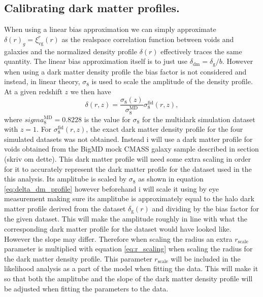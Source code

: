 \subsection{Calibrating dark matter profiles.}\label{sec:dm_calibrate}
When using a linear bias approximation we can simply approximate $\delta(r)_g=\xi_{\mathrm{vg}}^r(r)$ as the realspace correlation function between voids and galaxies and the normalized density profile $\delta(r)$ effectively traces the same quantity. The linear bias approximation itself is to just use $\delta_{\mathrm{dm}}=\delta_\mathrm{g}/b$. However when using a dark matter density profile the bias factor is not considered and instead, in linear theory, $\sigma_8$ is used to scale the amplitude of the density profile. At a given redshift $z$ we then have
\begin{equation}\label{eq:delta_dm_profile}
    \delta(r,z) = \frac{\sigma_8(z)}{\sigma_8^{\mathrm{MD}}}\sigma_8^\mathrm{fid}(r,z),
\end{equation}
where $sigma_8^{\mathrm{MD}}=0.8228$ is the value for $\sigma_8$ for the multidark simulation dataset with $z=1$. For $\sigma_8^\mathrm{fid}(r,z)$, the exact dark matter density profile for the four simulated datasets was not obtained. Instead i will use a dark matter profile for voids obtained from the BigMD mock CMASS galaxy sample described in section (skriv om dette). This dark matter profile will need some extra scaling in order for it to accurately represent the dark matter profile for the dataset used in the this analysis. Its amplitube is scaled by $\sigma_8$ as shown in equation \ref{eq:delta_dm_profile} however beforehand i will scale it using by eye measurement making sure its amplitube is approximately equal to the halo dark matter profile derived from the dataset $\delta_\mathrm{g}(r)$ and dividing by the bias factor for the given dataset. This will make the amplitude roughly in line with what the corresponding dark matter profile for the dataset would have looked like. However the slope may differ. Therefore when scaling the radius an extra $r_\mathrm{scale}$ parameter is multiplied with equation \ref{eq:r_scaling} when scaling the radius for the dark matter density profile. This parameter $r_\mathrm{scale}$ will be included in the likelihood analysis as a part of the model when fitting the data. This will make it so that both the amplitube and the slope of the dark matter density profile will be adjusted when fitting the parameters to the data.

